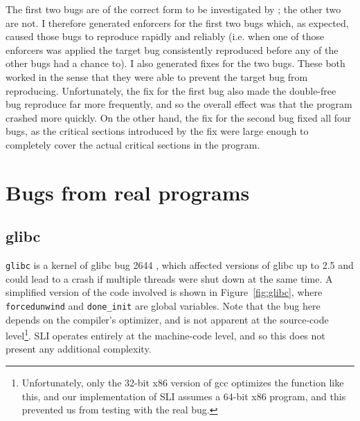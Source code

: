 The first two bugs are of the correct form to be investigated by
{\technique}; the other two are not.  I therefore generated enforcers
for the first two bugs which, as expected, caused those bugs to
reproduce rapidly and reliably (i.e. when one of those enforcers was
applied the target bug consistently reproduced before any of the other
bugs had a chance to).  I also generated fixes for the two bugs.
These both worked in the sense that they were able to prevent the
target bug from reproducing.  Unfortunately, the fix for the first bug
also made the double-free bug reproduce far more frequently, and so
the overall effect was that the program crashed more quickly.  On the
other hand, the fix for the second bug fixed all four bugs, as the
critical sections introduced by the fix were large enough to
completely cover the actual critical sections in the program.



\section{Bugs from real programs}

\subsection{glibc}

\verb|glibc| is a kernel of glibc bug 2644 \cite{glibc2644}, which
affected versions of glibc up to 2.5 and could lead to a crash if
multiple threads were shut down at the same time.  A simplified
version of the code involved is shown in Figure~\ref{fig:glibc}, where
\verb|forcedunwind| and \verb|done_init| are global variables.  Note
that the bug here depends on the compiler's optimizer, and is not
apparent at the source-code level\footnote{Unfortunately, only the
  32-bit x86 version of gcc optimizes the function like this, and our
  implementation of SLI assumes a 64-bit x86 program, and this
  prevented us from testing with the real bug.}.  SLI operates
entirely at the machine-code level, and so this does not present any
additional complexity.


